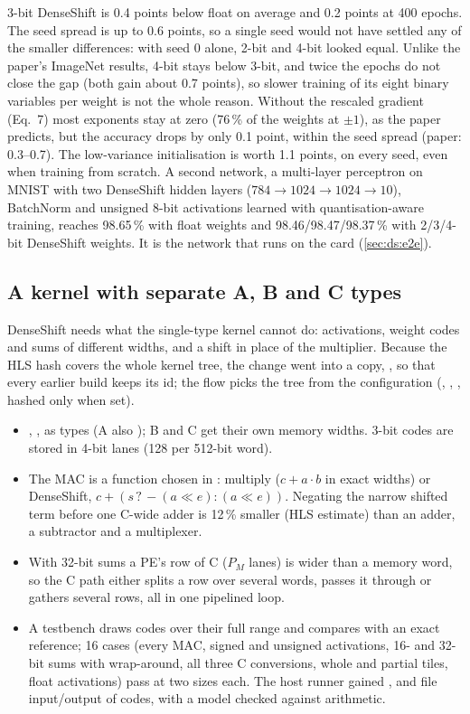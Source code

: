 3-bit DenseShift is 0.4 points below float on average and 0.2 points at 400 epochs. The seed spread is up to
0.6 points, so a single seed would not have settled any of the smaller differences: with seed 0 alone, 2-bit and
4-bit looked equal. Unlike the paper's ImageNet results, 4-bit stays below 3-bit, and twice the epochs do not close
the gap (both gain about 0.7 points), so slower training of its eight binary variables per weight is not the whole
reason. Without the rescaled gradient (Eq.~7) most exponents stay at zero (76\,\% of the weights at \(\pm1\)), as the
paper predicts, but the accuracy drops by only 0.1 point, within the seed spread (paper: 0.3--0.7). The low-variance
initialisation is worth 1.1 points, on every seed, even when training from scratch. A second network, a multi-layer perceptron on
MNIST with two DenseShift hidden layers (\(784 \to 1024 \to 1024 \to 10\)), BatchNorm and unsigned 8-bit activations
learned with quantisation-aware training, reaches 98.65\,\% with float weights and 98.46/98.47/98.37\,\% with
2/3/4-bit DenseShift weights. It is the network that runs on the card (\cref{sec:ds:e2e}).

\subsection{A kernel with separate A, B and C types}
\label{sec:ds:kernel}
DenseShift needs what the single-type kernel cannot do: activations, weight codes and sums of different widths, and a
shift in place of the multiplier. Because the HLS hash covers the whole kernel tree, the change went into a copy,
, so that every earlier build keeps its id; the flow picks the tree from the
configuration (, , , hashed only when set).
\begin{itemize}
  \item {}, ,  as  types (A also ); B and C
        get their own memory widths. 3-bit codes are stored in 4-bit lanes (128 per 512-bit word).
  \item The MAC is a function chosen in : multiply (\(c + a\cdot b\) in exact widths) or DenseShift,
        \(c + (s\,?\,-(a\ll e) : (a \ll e))\). Negating the narrow shifted term before one C-wide adder is 12\,\%
        smaller (HLS estimate) than an adder, a subtractor and a multiplexer.
  \item With 32-bit sums a PE's row of C (\(P_M\) lanes) is wider than a memory word, so the C path either splits a
        row over several words, passes it through or gathers several rows, all in one pipelined loop.
  \item A testbench draws codes over their full range and compares with an exact reference; 16 cases (every MAC,
        signed and unsigned activations, 16- and 32-bit sums with wrap-around, all three C conversions, whole and
        partial tiles, float activations) pass at two sizes each. The host runner gained ,
         and file input/output of codes, with a model checked against  arithmetic.
\end{itemize}

